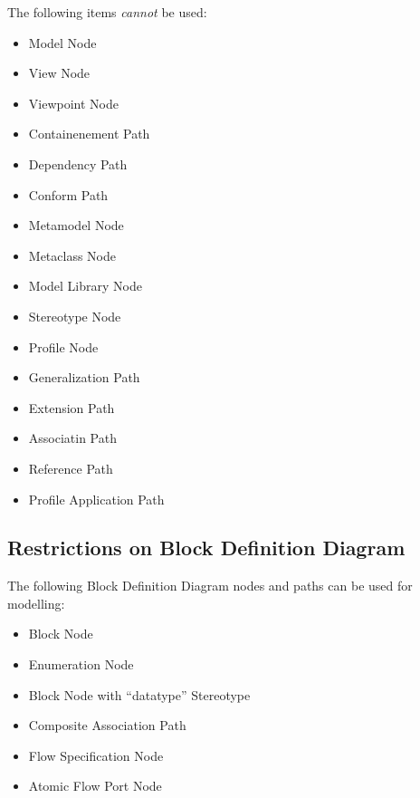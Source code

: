 The following items \emph{cannot} be used:
\begin{itemize}
\item Model Node
\item View Node
\item Viewpoint Node
\item Containenement Path
\item Dependency Path
\item Conform Path
\item Metamodel Node
\item Metaclass Node
\item Model Library Node
\item Stereotype Node
\item Profile Node
\item Generalization Path
\item Extension Path
\item Associatin Path
\item Reference Path
\item Profile Application Path
\end{itemize}

\subsection{Restrictions on Block Definition Diagram}

The following Block Definition Diagram nodes and paths can be used for
modelling:
\begin{itemize}
\item Block Node
\item Enumeration Node
\item Block Node with ``datatype'' Stereotype
\item Composite Association Path
\item Flow Specification Node
\item Atomic Flow Port Node
\end{itemize}

